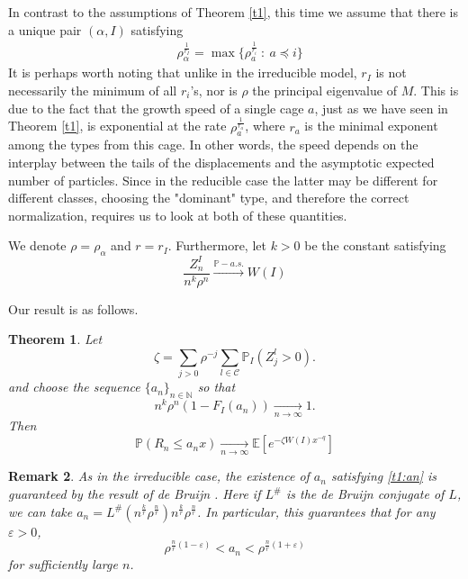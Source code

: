 \documentclass[12pt]{article}
\numberwithin{equation}{section}
\newtheorem{theorem}{Theorem}[section]
\newtheorem{remark}[theorem]{Remark}
\newcommand{\E}{\mathbb{E}}
\newcommand{\N}{\mathbb{N}}
\begin{document}
   In contrast to the assumptions of Theorem \ref{t1}, this time we assume that there is a unique pair $(\alpha,I)$ satisfying \begin{align*}
   &\rho_{\alpha}^{\frac 1 {r_I}} = \max{\{\rho_a^{\frac 1 {r_i}} \ : \ a \preceq i \}}
   \end{align*}
   It is perhaps worth noting that unlike in the irreducible model, $r_I$ is not necessarily the minimum of all $r_i$'s, nor is $\rho$ the principal eigenvalue of $M$. This is due to the fact that the growth speed of a single cage $a$, just as we have seen in Theorem \ref{t1}, is exponential at the rate $\rho_a^{\frac 1 {r_a}}$, where $r_a$ is the minimal exponent among the types from this cage. In other words, the speed depends on the interplay between the tails of the displacements and the asymptotic expected number of particles. Since in the reducible case the latter may be different for different classes, choosing the "dominant" type, and therefore the correct normalization, requires us to look at both of these quantities. 
   
   We denote $\rho=\rho_{\alpha}$ and $r = r_I$.
    Furthermore, let $k >0$ be the constant satisfying \[
   \frac {Z^I_n} {n^k\rho^n} \xrightarrow{\mathbb{P}-a.s.} W(I) 
   \]
    

 Our result is as follows.
\begin{theorem}\label{t3} Let \[\zeta =\sum_{j>0} \rho^{-j} \sum_{l \in \mathcal{C}}    \mathbb{P}_I\left(Z_j^l> 0\right).\] and choose the sequence $\{a_n\}_{n \in \N}$ so that 
\begin{equation*}\label{an2}
    n^k\rho^n \left(1-F_I(a_n)\right) \xrightarrow[ n \rightarrow \infty]{} 1.
\end{equation*}
Then
\[
\mathbb{P} ( R_n \leq a_n x)  \xrightarrow[ n \rightarrow \infty]{} \E[e^{-\zeta W(I)x^{-q}}]
\]
\end{theorem}
\begin{remark}\label{t3:remark}\emph{
    As in the irreducible case, the existence of $a_n$ satisfying \eqref{t1:an} is guaranteed by the result of de Bruijn \cite{DeBruijn}. Here if $L^\#$ is the de Bruijn conjugate of $L$, we can take $a_n = L^\#\left(n^{\frac k r}\rho^{\frac n {r}}\right) n^{\frac k r}\rho^{\frac n {r}}$. In particular, this guarantees that for any $\varepsilon > 0$, \begin{equation}
        \rho^{\frac n r (1-\varepsilon)} < a_n < \rho^{\frac n r (1+\varepsilon)}
    \end{equation}
    for sufficiently large $n$.
}\end{remark}
\end{document}
